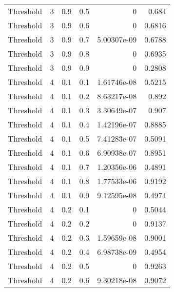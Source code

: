 \documentclass{article}
\begin{document}
\begin{longtable}[H]{lrrrrr}
 Threshold      &       3 &   0.9 &            0.5 &      0           &          0.684  \\
 Threshold      &       3 &   0.9 &            0.6 &      0           &          0.6816 \\
 Threshold      &       3 &   0.9 &            0.7 &      5.00307e-09 &          0.6788 \\
 Threshold      &       3 &   0.9 &            0.8 &      0           &          0.6935 \\
 Threshold      &       3 &   0.9 &            0.9 &      0           &          0.2808 \\
 Threshold      &       4 &   0.1 &            0.1 &      1.61746e-08 &          0.5215 \\
 Threshold      &       4 &   0.1 &            0.2 &      8.63217e-08 &          0.892  \\
 Threshold      &       4 &   0.1 &            0.3 &      3.30649e-07 &          0.907  \\
 Threshold      &       4 &   0.1 &            0.4 &      1.42196e-07 &          0.8885 \\
 Threshold      &       4 &   0.1 &            0.5 &      7.41283e-07 &          0.5091 \\
 Threshold      &       4 &   0.1 &            0.6 &      6.90938e-07 &          0.8951 \\
 Threshold      &       4 &   0.1 &            0.7 &      1.20356e-06 &          0.4891 \\
 Threshold      &       4 &   0.1 &            0.8 &      1.77533e-06 &          0.9192 \\
 Threshold      &       4 &   0.1 &            0.9 &      9.12595e-08 &          0.4974 \\
 Threshold      &       4 &   0.2 &            0.1 &      0           &          0.5044 \\
 Threshold      &       4 &   0.2 &            0.2 &      0           &          0.9137 \\
 Threshold      &       4 &   0.2 &            0.3 &      1.59659e-08 &          0.9001 \\
 Threshold      &       4 &   0.2 &            0.4 &      6.98738e-09 &          0.4954 \\
 Threshold      &       4 &   0.2 &            0.5 &      0           &          0.9263 \\
 Threshold      &       4 &   0.2 &            0.6 &      9.30218e-08 &          0.9072 \\

\end{longtable}
\end{document}
